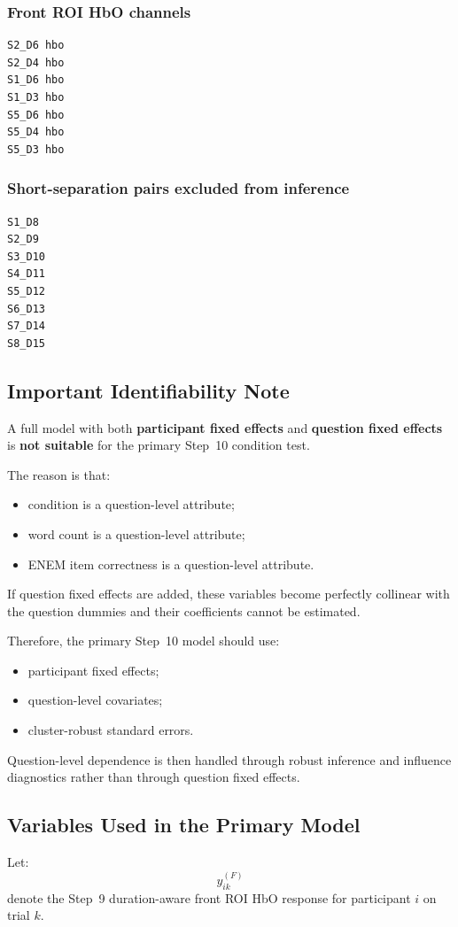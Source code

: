 \subsubsection{Front ROI HbO channels}
\begin{verbatim}
S2_D6 hbo
S2_D4 hbo
S1_D6 hbo
S1_D3 hbo
S5_D6 hbo
S5_D4 hbo
S5_D3 hbo
\end{verbatim}

\subsubsection{Short-separation pairs excluded from inference}
\begin{verbatim}
S1_D8
S2_D9
S3_D10
S4_D11
S5_D12
S6_D13
S7_D14
S8_D15
\end{verbatim}

\subsection{Important Identifiability Note}
A full model with both \textbf{participant fixed effects} and \textbf{question fixed effects}
is \textbf{not suitable} for the primary Step~10 condition test.

The reason is that:
\begin{itemize}
    \item condition is a question-level attribute;
    \item word count is a question-level attribute;
    \item ENEM item correctness is a question-level attribute.
\end{itemize}

If question fixed effects are added, these variables become perfectly collinear with the question dummies
and their coefficients cannot be estimated.

Therefore, the primary Step~10 model should use:
\begin{itemize}
    \item participant fixed effects;
    \item question-level covariates;
    \item cluster-robust standard errors.
\end{itemize}

Question-level dependence is then handled through robust inference and influence diagnostics rather than
through question fixed effects.

\subsection{Variables Used in the Primary Model}
Let:
\begin{equation}
y^{(F)}_{ik}
\end{equation}
denote the Step~9 duration-aware front ROI HbO response for participant \(i\) on trial \(k\).

